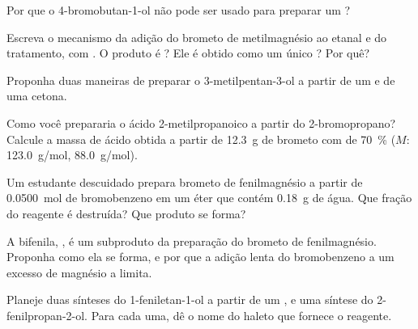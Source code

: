 \begin{exercise}[$\star$]\label{exo:b1:organomagnesium:4}
Por que o 4-bromobutan-1-ol não pode ser usado para preparar um ?
\end{exercise}

\begin{exercise}[$\star\star$]\label{exo:b1:organomagnesium:5}
Escreva o mecanismo da adição do brometo de metilmagnésio ao etanal e
do tratamento, com . O produto é ? Ele é obtido como
um único ? Por quê?
\end{exercise}

\begin{exercise}[$\star\star$]\label{exo:b1:organomagnesium:6}
Proponha duas maneiras de preparar o 3-metilpentan-3-ol a partir de um
 e de uma cetona.
\end{exercise}

\begin{exercise}[$\star\star$]\label{exo:b1:organomagnesium:7}
Como você prepararia o ácido 2-metilpropanoico a partir do
2-bromopropano? Calcule a massa de ácido obtida a partir de
\qty{12.3}{g} de brometo com  de \qty{70}{\percent} ($M$:
 \qty{123.0}{g/mol},  \qty{88.0}{g/mol}).
\end{exercise}

\begin{exercise}[$\star\star$]\label{exo:b1:organomagnesium:8}
Um estudante descuidado prepara brometo de fenilmagnésio a partir de
\qty{0.0500}{mol} de bromobenzeno em um éter que contém \qty{0.18}{g} de
água. Que fração do reagente é destruída? Que produto se forma?
\end{exercise}

\begin{exercise}[$\star\star$]\label{exo:b1:organomagnesium:9}
A bifenila, , é um subproduto da preparação do brometo de
fenilmagnésio. Proponha como ela se forma, e por que a adição lenta do
bromobenzeno a um excesso de magnésio a limita.
\end{exercise}

\begin{exercise}[$\star\star\star$]\label{exo:b1:organomagnesium:10}
Planeje duas sínteses do 1-feniletan-1-ol a partir de um , e uma síntese do 2-fenilpropan-2-ol. Para cada uma, dê o nome
do haleto que fornece o reagente.
\end{exercise}

